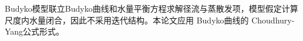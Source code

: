 Budyko模型联立Budyko曲线和水量平衡方程求解径流与蒸散发项，模型假定计算尺度内水量闭合，因此不采用迭代结构。本论文应用
Budyko曲线的 Choudhury-Yang公式形式。


\iffalse
\section{蒙特卡洛模拟不确定度分析}
本节使用蒙特卡洛模拟算法生成日水文数据，（简单的天气发生器）。算法输入项如下：
\begin{itemize}
\item 降水频率
\item 次雨深
\item 潜在蒸散发
\item 下垫面不均匀性
\item 有效根深
\end{itemize}
 
\subsection{观测精度}

\subsection{潜在蒸散发}

\subsection{次雨深}

\subsection{降水频次}

\subsection{下垫面不均匀性}

\subsection{有效根深}


\subsection{季节性}
\fi


